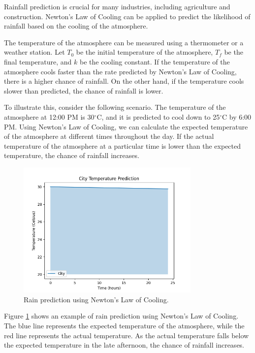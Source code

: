 \documentclass[12pt, a4paper]{article}
\begin{document}
Rainfall prediction is crucial for many industries, including agriculture and construction. Newton's Law of Cooling can be applied to predict the likelihood of rainfall based on the cooling of the atmosphere.

The temperature of the atmosphere can be measured using a thermometer or a weather station. Let $T_0$ be the initial temperature of the atmosphere, $T_f$ be the final temperature, and $k$ be the cooling constant. If the temperature of the atmosphere cools faster than the rate predicted by Newton's Law of Cooling, there is a higher chance of rainfall. On the other hand, if the temperature cools slower than predicted, the chance of rainfall is lower.

To illustrate this, consider the following scenario. The temperature of the atmosphere at 12:00 PM is 30$^\circ$C, and it is predicted to cool down to 25$^\circ$C by 6:00 PM. Using Newton's Law of Cooling, we can calculate the expected temperature of the atmosphere at different times throughout the day. If the actual temperature of the atmosphere at a particular time is lower than the expected temperature, the chance of rainfall increases.

\begin{figure}[h]
\centering
\includegraphics[width=0.8\textwidth]{rain_prediction.png}
\caption{Rain prediction using Newton's Law of Cooling.}
\label{fig:rain_prediction}
\end{figure}

Figure \ref{fig:rain_prediction} shows an example of rain prediction using Newton's Law of Cooling. The blue line represents the expected temperature of the atmosphere, while the red line represents the actual temperature. As the actual temperature falls below the expected temperature in the late afternoon, the chance of rainfall increases.
\end{document}
